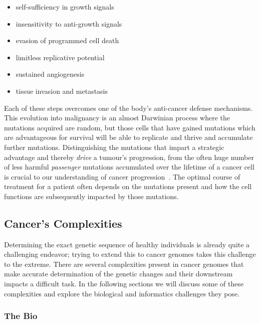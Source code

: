 \begin{justify}
\begin{itemize}
    \itemsep-0.5em
    \item self-sufficiency in growth signals
    \item insensitivity to anti-growth signals
    \item evasion of programmed cell death
    \item limitless replicative potential
    \item sustained angiogenesis
    \item tissue invasion and metastasis
\end{itemize}

Each of these steps overcomes one of the body's anti-cancer defense mechanisms. This evolution into malignancy is an almost Darwinian process where the mutations acquired are random, but those cells that have gained mutations which are advantageous for survival will be able to replicate and thrive and accumulate further mutations. Distinguishing the mutations that impart a strategic advantage and thereby \emph{drive} a tumour's progression, from the often huge number of less harmful \emph{passenger} mutations accumulated over the lifetime of a cancer cell is crucial to our understanding of cancer progression~\cite{stratton2009cancer}. The optimal course of treatment for a patient often depends on the mutations present and how the cell functions are subsequently impacted by those mutations. %



\subsection{Cancer's Complexities}

Determining the exact genetic sequence of healthy individuals is already quite a challenging endeavor; trying to extend this to cancer genomes takes this challenge to the extreme. There are several complexities present in cancer genomes that make accurate determination of the genetic changes and their downstream impacts a difficult task. In the following sections we will discuss some of these complexities and explore the biological and informatics challenges they pose.

\subsubsection{The Bio}

\end{justify}
